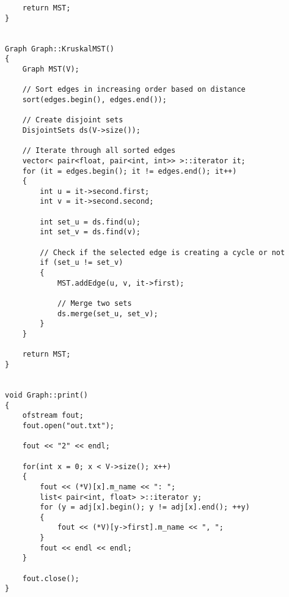 \documentclass[a4paper]{article}
\begin{document}
\begin{verbatim}
    return MST;
} 


Graph Graph::KruskalMST() 
{ 
    Graph MST(V);

    // Sort edges in increasing order based on distance
    sort(edges.begin(), edges.end()); 
    
    // Create disjoint sets 
    DisjointSets ds(V->size()); 
    
    // Iterate through all sorted edges 
    vector< pair<float, pair<int, int>> >::iterator it; 
    for (it = edges.begin(); it != edges.end(); it++) 
    { 
        int u = it->second.first; 
        int v = it->second.second; 
    
        int set_u = ds.find(u); 
        int set_v = ds.find(v); 
    
        // Check if the selected edge is creating a cycle or not
        if (set_u != set_v) 
        { 
            MST.addEdge(u, v, it->first);

            // Merge two sets 
            ds.merge(set_u, set_v); 
        } 
    }

    return MST; 
}


void Graph::print()
{
    ofstream fout;
    fout.open("out.txt");
    
    fout << "2" << endl;

    for(int x = 0; x < V->size(); x++)
    {
        fout << (*V)[x].m_name << ": ";
        list< pair<int, float> >::iterator y; 
        for (y = adj[x].begin(); y != adj[x].end(); ++y) 
        {
            fout << (*V)[y->first].m_name << ", ";
        }   
        fout << endl << endl;
    }

    fout.close();
}

    \end{verbatim}
\end{document}
